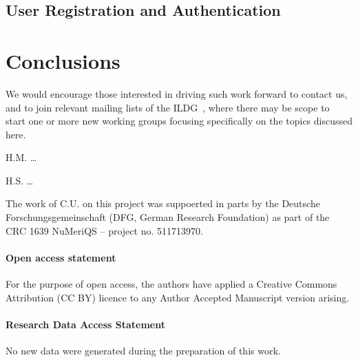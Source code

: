 \documentclass[a4paper,11pt]{article} \usepackage{pos} \usepackage{subcaption}
\begin{document}
\subsection{User Registration and Authentication}

\section{Conclusions}


We would encourage those interested in driving such work forward
to contact us,
and to join relevant mailing lists of the ILDG~\cite{ildg-organization},
where there may be scope to start one or more new working groups
focusing specifically on the topics discussed here.


\acknowledgments

H.M. \dots

H.S. \dots

The work of C.U. on this project was suppoerted in parts by the
Deutsche Forschungsgemeinschaft (DFG, German Research Foundation) as
part of the CRC 1639 NuMeriQS – project no. 511713970. 


\paragraph*{Open access statement}
For the purpose of open access, the authors have applied a Creative Commons
Attribution (CC BY) licence to any Author Accepted Manuscript version arising.

\paragraph*{Research Data Access Statement}
No new data were generated during the preparation of this work.



\end{document}

